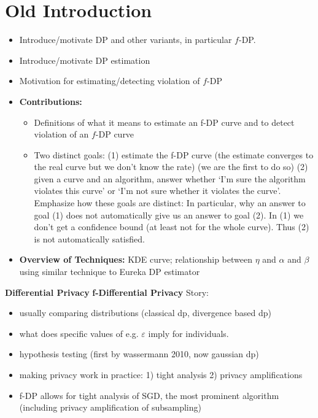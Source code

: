 \section{Old Introduction}
\begin{itemize}
    \item Introduce/motivate DP and other variants, in particular $f$-DP.

    
    \item Introduce/motivate DP estimation
    \item Motivation for estimating/detecting violation of $f$-DP
    \item \textbf{Contributions:} \begin{itemize}
        \item Definitions of what it means to estimate an f-DP curve and to detect violation of an $f$-DP curve 
        \item Two distinct goals: (1) estimate the f-DP curve (the estimate converges to the real curve but we don't know the rate) (we are the first to do so) (2) given a curve and an algorithm, answer whether `I'm sure the algorithm violates this curve' or `I'm not sure whether it violates the curve'. Emphasize how these goals are distinct: In particular, why an answer to goal (1) does not automatically give us an answer to goal (2). In (1) we don't get a confidence bound (at least not for the whole curve). Thus (2) is not automatically satisfied.
    \end{itemize}
    \item \textbf{Overview of Techniques:} KDE curve; relationship between $\eta$ and $\alpha$ and $\beta$ using similar technique to Eureka DP estimator
\end{itemize}
\textbf{Differential Privacy}
\textbf{f-Differential Privacy}
Story: \begin{itemize}
    \item usually comparing distributions (classical dp, divergence based dp)
    \item what does specific values of e.g. $\varepsilon$ imply for individuals.
    \item hypothesis testing (first by wassermann 2010, now gaussian dp)
    \item making privacy work in practice: 1) tight analysis
    2) privacy amplifications
    \item f-DP allows for tight analysis of SGD, the most prominent algorithm (including privacy amplification of subsampling)
\end{itemize}
